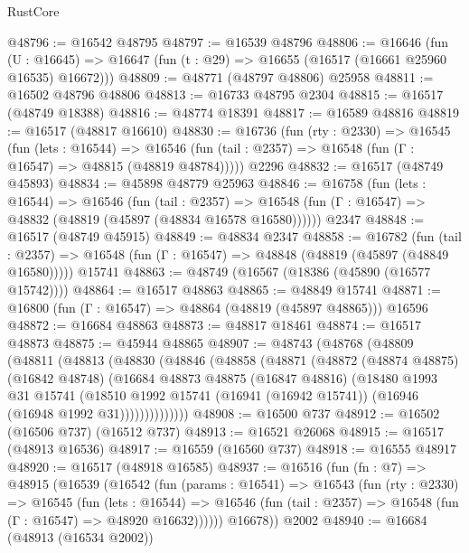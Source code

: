 \begin{lexlean}{RustCore}
\begin{coremodule}
@48796 := @16542 @48795
@48797 := @16539 @48796
@48806 := @16646
    (fun (U : @16645) => @16647 (fun (t : @29) => @16655 (@16517 (@16661 @25960 @16535) @16672)))
@48809 := @48771 (@48797 @48806) @25958
@48811 := @16502 @48796 @48806
@48813 := @16733 @48795 @2304
@48815 := @16517 (@48749 @18388)
@48816 := @48774 @18391
@48817 := @16589 @48816
@48819 := @16517 (@48817 @16610)
@48830 := @16736
    (fun (rty : @2330) =>
    @16545
      (fun (lets : @16544) =>
      @16546 (fun (tail : @2357) => @16548 (fun (Γ : @16547) => @48815 (@48819 @48784)))))
    @2296
@48832 := @16517 (@48749 @45893)
@48834 := @45898 @48779 @25963
@48846 := @16758
    (fun (lets : @16544) =>
    @16546
      (fun (tail : @2357) =>
      @16548 (fun (Γ : @16547) => @48832 (@48819 (@45897 (@48834 @16578 @16580))))))
    @2347
@48848 := @16517 (@48749 @45915)
@48849 := @48834 @2347
@48858 := @16782
    (fun (tail : @2357) => @16548 (fun (Γ : @16547) => @48848 (@48819 (@45897 (@48849 @16580)))))
    @15741
@48863 := @48749 (@16567 (@18386 (@45890 (@16577 @15742))))
@48864 := @16517 @48863
@48865 := @48849 @15741
@48871 := @16800 (fun (Γ : @16547) => @48864 (@48819 (@45897 @48865))) @16596
@48872 := @16684 @48863
@48873 := @48817 @18461
@48874 := @16517 @48873
@48875 := @45944 @48865
@48907 := @48743
    (@48768
      (@48809
        (@48811
          (@48813
            (@48830
              (@48846
                (@48858
                  (@48871
                    (@48872
                      (@48874 @48875)
                      (@16842 @48748)
                      (@16684
                        @48873
                        @48875
                        (@16847 @48816)
                        (@18480
                          @1993
                          @31
                          @15741
                          (@18510
                            @1992
                            @15741
                            (@16941 (@16942 @15741))
                            (@16946 (@16948 @1992 @31))))))))))))))
@48908 := @16500 @737
@48912 := @16502 (@16506 @737) (@16512 @737)
@48913 := @16521 @26068
@48915 := @16517 (@48913 @16536)
@48917 := @16559 (@16560 @737)
@48918 := @16555 @48917
@48920 := @16517 (@48918 @16585)
@48937 := @16516
    (fun (fn : @7) =>
    @48915
      (@16539
        (@16542
          (fun (params : @16541) =>
          @16543
            (fun (rty : @2330) =>
            @16545
              (fun (lets : @16544) =>
              @16546 (fun (tail : @2357) => @16548 (fun (Γ : @16547) => @48920 @16632))))))
        @16678))
    @2002
@48940 := @16684 (@48913 (@16534 @2002))

\end{coremodule}
\end{lexlean}

